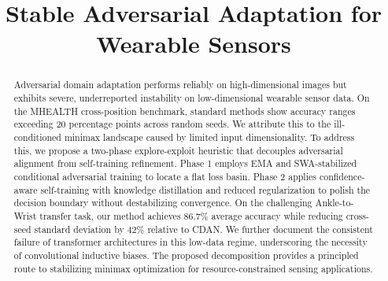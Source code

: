 \documentclass[conference]{IEEEtran}
\begin{document}
\title{Stable Adversarial Adaptation for Wearable Sensors}

\author{
\and
{}
}

\maketitle

\begin{abstract}
Adversarial domain adaptation performs reliably on high-dimensional images but exhibits severe, underreported instability on low-dimensional wearable sensor data. On the MHEALTH cross-position benchmark, standard methods show accuracy ranges exceeding 20 percentage points across random seeds. We attribute this to the ill-conditioned minimax landscape caused by limited input dimensionality. To address this, we propose a two-phase explore-exploit heuristic that decouples adversarial alignment from self-training refinement. Phase 1 employs EMA and SWA-stabilized conditional adversarial training to locate a flat loss basin. Phase 2 applies confidence-aware self-training with knowledge distillation and reduced regularization to polish the decision boundary without destabilizing convergence. On the challenging Ankle-to-Wrist transfer task, our method achieves 86.7\% average accuracy while reducing cross-seed standard deviation by 42\% relative to CDAN. We further document the consistent failure of transformer architectures in this low-data regime, underscoring the necessity of convolutional inductive biases. The proposed decomposition provides a principled route to stabilizing minimax optimization for resource-constrained sensing applications.
\end{abstract}
\end{document}
